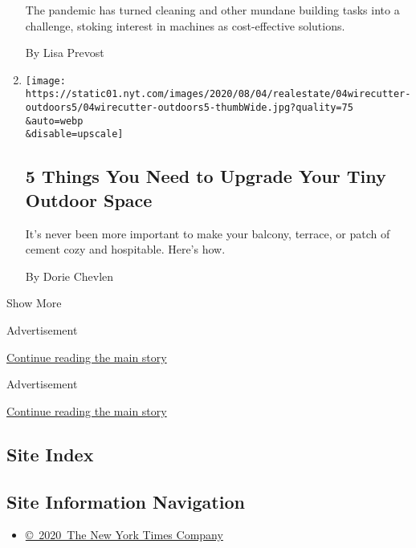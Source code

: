\begin{enumerate}
  The pandemic has turned cleaning and other mundane building tasks into
  a challenge, stoking interest in machines as cost-effective solutions.

  By Lisa Prevost
\item
  \href{/2020/08/04/realestate/upgrade-your-outdoor-space.html}{}

  \texttt{[image: https://static01.nyt.com/images/2020/08/04/realestate/04wirecutter-outdoors5/04wirecutter-outdoors5-thumbWide.jpg?quality=75\\\&auto=webp\\\&disable=upscale]}

  \hypertarget{5-things-you-need-to-upgrade-your-tiny-outdoor-space}{%
  \subsection{5 Things You Need to Upgrade Your Tiny Outdoor
  Space}\label{5-things-you-need-to-upgrade-your-tiny-outdoor-space}}

  It's never been more important to make your balcony, terrace, or patch
  of cement cozy and hospitable. Here's how.

  By Dorie Chevlen
\end{enumerate}

Show More

Advertisement

\protect\hyperlink{after-mid3}{Continue reading the main story}

Advertisement

\protect\hyperlink{after-mktg}{Continue reading the main story}

\hypertarget{site-index}{%
\subsection{Site Index}\label{site-index}}

\hypertarget{site-information-navigation}{%
\subsection{Site Information
Navigation}\label{site-information-navigation}}

\begin{itemize}
\tightlist
\item
  \href{https://help.nytimes.com/hc/en-us/articles/115014792127-Copyright-notice}{©~2020~The
  New York Times Company}
\end{itemize}

